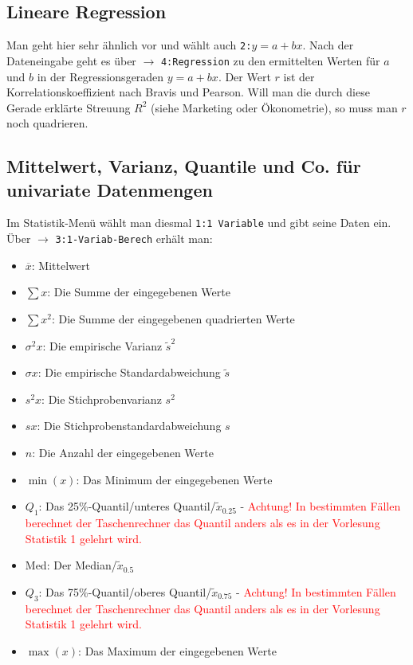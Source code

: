 \documentclass{article}
\newcommand{\taste}[1]{\fbox{\begin{varwidth}{\dimexpr\textwidth-2\fboxsep-2\fboxrule\relax}#1\end{varwidth}}}
\begin{document}
	\subsection*{Lineare Regression}
	
	Man geht hier sehr ähnlich vor und wählt auch \texttt{2:$y=a+bx$}. Nach der Dateneingabe geht es über \taste{OPTN} $\to$ \texttt{4:Regression} zu den ermittelten Werten für $a$ und $b$ in der Regressionsgeraden $y=a+bx$. Der Wert $r$ ist der Korrelationskoeffizient nach Bravis und Pearson. Will man die durch diese Gerade erklärte Streuung $R^2$ (siehe Marketing oder Ökonometrie), so muss man $r$ noch quadrieren.
	
	\subsection*{Mittelwert, Varianz, Quantile und Co. für univariate Datenmengen}
	
	Im Statistik-Menü wählt man diesmal \texttt{1:1 Variable} und gibt seine Daten ein. Über \taste{OPTN} $\to$ \texttt{3:1-Variab-Berech} erhält man:
	\begin{itemize}
		\item $\overline{x}$: Mittelwert
		\item $\sum x$: Die Summe der eingegebenen Werte
		\item $\sum x^2$: Die Summe der eingegebenen quadrierten Werte
		\item $\sigma^2 x$: Die empirische Varianz $\tilde{s}^2$
		\item $\sigma x$: Die empirische Standardabweichung $\tilde{s}$
		\item $s^2 x$: Die Stichprobenvarianz $s^2$
		\item $sx$: Die Stichprobenstandardabweichung $s$
		\item $n$: Die Anzahl der eingegebenen Werte
		\item $\min(x)$: Das Minimum der eingegebenen Werte
		\item $Q_1$: Das 25\%-Quantil/unteres Quantil/$\tilde{x}_{0.25}$ - \textcolor{red}{Achtung! In bestimmten Fällen berechnet der Taschenrechner das Quantil anders als es in der Vorlesung Statistik 1 gelehrt wird.}
		\item Med: Der Median/$\tilde{x}_{0.5}$
		\item $Q_3$: Das 75\%-Quantil/oberes Quantil/$\tilde{x}_{0.75}$ - \textcolor{red}{Achtung! In bestimmten Fällen berechnet der Taschenrechner das Quantil anders als es in der Vorlesung Statistik 1 gelehrt wird.}
		\item $\max(x)$: Das Maximum der eingegebenen Werte
	\end{itemize}
	
\end{document}
